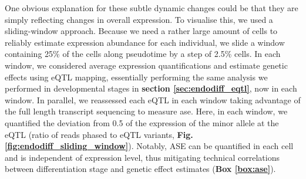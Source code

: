 One obvious explanation for these subtle dynamic changes could be that they are simply reflecting changes in overall expression. 
To visualise this, we used a sliding-window approach. 
Because we need a rather large amount of cells to reliably estimate expression abundance for each individual, we slide a window containing 25\% of the cells along pseudotime by a step of 2.5\% cells.
In each window, we considered average expression quantifications and estimate genetic effects using eQTL mapping, essentially performing the same analysis we performed in developmental stages in \textbf{section \ref{sec:endodiff_eqtl}}, now in each window.
In parallel, we reassessed each eQTL in each window taking advantage of the full length transcript sequencing to measure \gls{ase}.
Here, in each window, we quantified the deviation from 0.5 of the expression of the minor allele at the eQTL (ratio of reads phased to eQTL variants, \textbf{Fig. \ref{fig:endodiff_sliding_window}}). 
Notably, ASE can be quantified in each cell and is independent of expression level, thus mitigating technical correlations between differentiation stage and genetic effect estimates (\textbf{Box \ref{box:ase}}). 


\newpage

